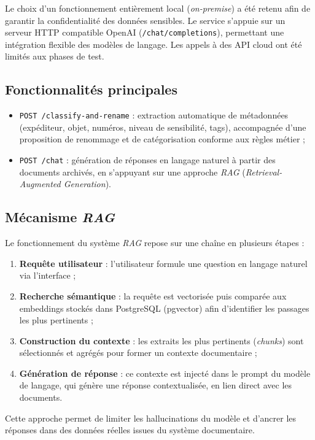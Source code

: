 \documentclass[12pt,a4paper]{report}
\begin{document}
Le choix d’un fonctionnement entièrement local (\textit{on-premise}) a été retenu afin de garantir la confidentialité des données sensibles. Le service s’appuie sur un serveur HTTP compatible OpenAI (\texttt{/chat/completions}), permettant une intégration flexible des modèles de langage. Les appels à des API cloud ont été limités aux phases de test.

\subsection*{Fonctionnalités principales}
\begin{itemize}
  \item \texttt{POST /classify-and-rename} : extraction automatique de métadonnées (expéditeur, objet, numéros, niveau de sensibilité, tags), accompagnée d’une proposition de renommage et de catégorisation conforme aux règles métier ;
  \item \texttt{POST /chat} : génération de réponses en langage naturel à partir des documents archivés, en s’appuyant sur une approche \textit{RAG} (\textit{Retrieval-Augmented Generation}).
\end{itemize}

\subsection*{Mécanisme \textit{RAG}}
Le fonctionnement du système \textit{RAG} repose sur une chaîne en plusieurs étapes :
\begin{enumerate}
  \item \textbf{Requête utilisateur} : l’utilisateur formule une question en langage naturel via l’interface ;
  \item \textbf{Recherche sémantique} : la requête est vectorisée puis comparée aux embeddings stockés dans PostgreSQL (pgvector) afin d’identifier les passages les plus pertinents ;
  \item \textbf{Construction du contexte} : les extraits les plus pertinents (\textit{chunks}) sont sélectionnés et agrégés pour former un contexte documentaire ;
  \item \textbf{Génération de réponse} : ce contexte est injecté dans le prompt du modèle de langage, qui génère une réponse contextualisée, en lien direct avec les documents.
\end{enumerate}

Cette approche permet de limiter les hallucinations du modèle et d’ancrer les réponses dans des données réelles issues du système documentaire.
\end{document}
